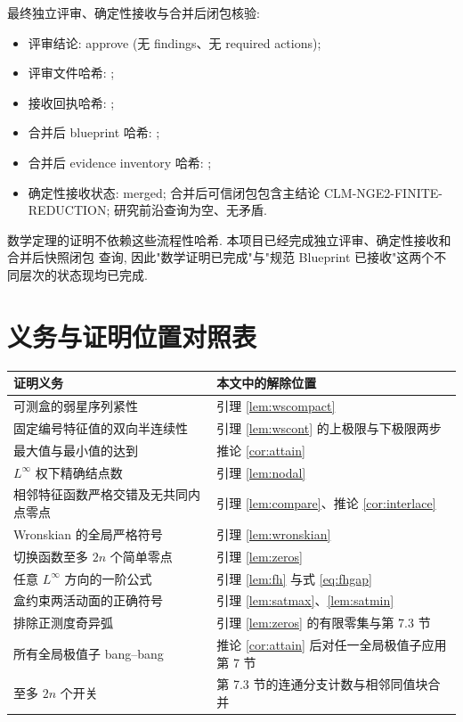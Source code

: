 \documentclass[UTF8]{ctexart}
\begin{document}
最终独立评审、确定性接收与合并后闭包核验:
\begin{itemize}
	\item 评审结论: approve (无 findings、无 required actions);
	\item 评审文件哈希: \texttt{};
	\item 接收回执哈希: \texttt{};
	\item 合并后 blueprint 哈希: \texttt{};
	\item 合并后 evidence inventory 哈希: \texttt{};
	\item 确定性接收状态: merged; 合并后可信闭包包含主结论 CLM-NGE2-FINITE-REDUCTION;
		研究前沿查询为空、无矛盾.
\end{itemize}
数学定理的证明不依赖这些流程性哈希. 本项目已经完成独立评审、确定性接收和合并后快照闭包
查询, 因此"数学证明已完成"与"规范 Blueprint 已接收"这两个不同层次的状态现均已完成.

\appendix
\section{义务与证明位置对照表}

\begin{center}
\begin{tabular}{ll}
\toprule
证明义务 & 本文中的解除位置\\
\midrule
可测盒的弱星序列紧性 & 引理 \ref{lem:wscompact}\\
固定编号特征值的双向半连续性 & 引理 \ref{lem:wscont} 的上极限与下极限两步\\
最大值与最小值的达到 & 推论 \ref{cor:attain}\\
$L^\infty$ 权下精确结点数 & 引理 \ref{lem:nodal}\\
相邻特征函数严格交错及无共同内点零点 & 引理 \ref{lem:compare}、推论 \ref{cor:interlace}\\
Wronskian 的全局严格符号 & 引理 \ref{lem:wronskian}\\
切换函数至多 $2n$ 个简单零点 & 引理 \ref{lem:zeros}\\
任意 $L^\infty$ 方向的一阶公式 & 引理 \ref{lem:fh} 与式 \eqref{eq:fhgap}\\
盒约束两活动面的正确符号 & 引理 \ref{lem:satmax}、\ref{lem:satmin}\\
排除正测度奇异弧 & 引理 \ref{lem:zeros} 的有限零集与第 7.3 节\\
所有全局极值子 bang--bang & 推论 \ref{cor:attain} 后对任一全局极值子应用第 7 节\\
至多 $2n$ 个开关 & 第 7.3 节的连通分支计数与相邻同值块合并\\
\bottomrule
\end{tabular}
\end{center}
\end{document}

